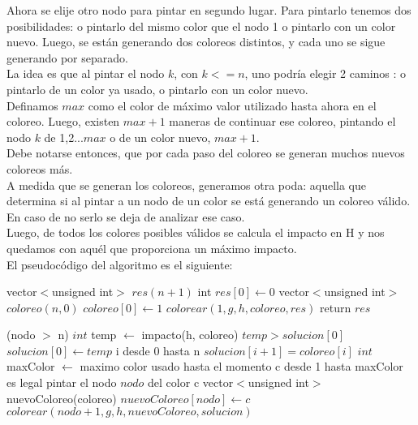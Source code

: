 \indent Ahora se elije otro nodo para pintar en segundo lugar. Para pintarlo tenemos dos posibilidades: o pintarlo del mismo color que el nodo 1 o pintarlo con un color nuevo. Luego, se están generando dos coloreos distintos, y cada uno se sigue generando por separado.\\
\indent La idea es que al pintar el nodo $k$, con $k<=n$, uno podría elegir 2 caminos : o pintarlo de un color ya usado, o pintarlo con un color nuevo.\\
\indent Definamos $max$ como el color de máximo valor utilizado hasta ahora en el coloreo. Luego, existen $max+1$ maneras de continuar ese coloreo, pintando el nodo $k$ de 1,2...$max$ o de un color nuevo, $max+1$.\\
\indent Debe notarse entonces, que por cada paso del coloreo se generan muchos nuevos coloreos más.\\
\indent A medida que se generan los coloreos, generamos otra poda: aquella que determina si al pintar a un nodo de un color se está generando un coloreo válido. En caso de no serlo se deja de analizar ese caso.\\
\indent Luego, de todos los colores posibles válidos se calcula el impacto en H y nos quedamos con aquél que proporciona un máximo impacto.\\

\indent El pseudocódigo del algoritmo es el siguiente:\\   





\begin{algorithm}[H]
\caption{} 
\begin{codebox}

\li vector$<$unsigned int$>$ $res(n+1)$
\li int $res[0] \gets 0$
\li vector$<$unsigned int$>$ $coloreo(n,0)$
\li $coloreo[0] \gets 1$
\li $colorear(1,g,h,coloreo,res)$
\li	return $res$
\End
\end{codebox}
\end{algorithm}


\begin{algorithm}[H]
\caption{} 
\begin{codebox}

\li \If (nodo $>$ n) \Do
\li 	$int$ temp $\gets$ impacto(h, coloreo)
\li		\If $temp > solucion[0]$ \Do
\li			$solucion[0] \gets temp$
\li			\For i desde 0 hasta n \Do
\li				$solucion[i+1]=coloreo[i]$
			\End
		\End
	\End
\li \Else \Do
\li		$int$ maxColor $\gets $ maximo color usado hasta el momento 	
\li		\For c desde 1 hasta maxColor \Do
\li			\If es legal pintar el nodo $nodo$ del color c \Do
\li				vector$<$unsigned int$>$ nuevoColoreo(coloreo)
\li             $nuevoColoreo[nodo] \gets c$
\li             $colorear(nodo+1,g,h,nuevoColoreo,solucion)$
             \End
         \End
\End
\end{codebox}
\end{algorithm}


